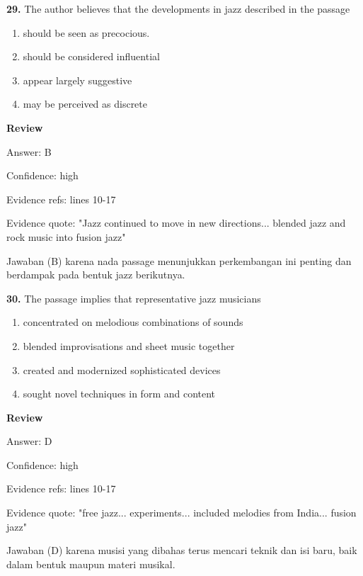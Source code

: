 \documentclass[12pt]{article}
\begin{document}
\vspace{0.25\baselineskip}
\noindent\textbf{29.} The author believes that the developments in jazz described in the passage
\begin{enumerate}[label=(\Alph*),leftmargin=*,itemsep=0.2em]
\item should be seen as precocious.
\item should be considered influential
\item appear largely suggestive
\item may be perceived as discrete
\end{enumerate}
\par
\begingroup
\setlength{\parskip}{0pt}
\setlength{\parindent}{0pt}
\textbf{Review}\par
Answer: B\par
Confidence: high\par
Evidence refs: lines 10-17\par
Evidence quote: "Jazz continued to move in new directions... blended jazz and rock music into fusion jazz"\par
Jawaban (B) karena nada passage menunjukkan perkembangan ini penting dan berdampak pada bentuk jazz berikutnya.\par
\endgroup
\par
\vspace{0.25\baselineskip}
\noindent\textbf{30.} The passage implies that representative jazz musicians
\begin{enumerate}[label=(\Alph*),leftmargin=*,itemsep=0.2em]
\item concentrated on melodious combinations of sounds
\item blended improvisations and sheet music together
\item created and modernized sophisticated devices
\item sought novel techniques in form and content
\end{enumerate}
\par
\begingroup
\setlength{\parskip}{0pt}
\setlength{\parindent}{0pt}
\textbf{Review}\par
Answer: D\par
Confidence: high\par
Evidence refs: lines 10-17\par
Evidence quote: "free jazz... experiments... included melodies from India... fusion jazz"\par
Jawaban (D) karena musisi yang dibahas terus mencari teknik dan isi baru, baik dalam bentuk maupun materi musikal.\par
\end{document}
